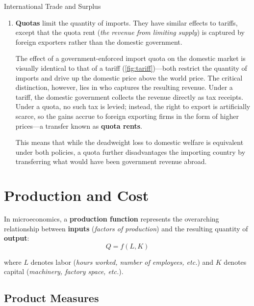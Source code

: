 \documentclass[10pt]{article}
\begin{document}
\begin{core}{International Trade and Surplus}
\begin{enumerate}
        \item \textbf{Quotas} limit the quantity of imports. They have similar effects to tariffs, except that the quota rent (\textit{the revenue from limiting supply}) is captured by foreign exporters rather than the domestic government.

        The effect of a government-enforced import quota on the domestic market is visually identical to that of a tariff (\autoref{fig:tariff})---both restrict the quantity of imports and drive up the domestic price above the world price. The critical distinction, however, lies in who captures the resulting revenue. Under a tariff, the domestic government collects the revenue directly as tax receipts. Under a quota, no such tax is levied; instead, the right to export is artificially scarce, so the gains accrue to foreign exporting firms in the form of higher prices---a transfer known as \textbf{quota rents}.

        This means that while the deadweight loss to domestic welfare is equivalent under both policies, a quota further disadvantages the importing country by transferring what would have been government revenue abroad.

      \end{enumerate}

    \end{core}
 
\section{Production and Cost}

  In microeconomics, a \textbf{production function} represents the overarching relationship between \textbf{inputs} (\textit{factors of production}) and the resulting quantity of \textbf{output}:
  \[
    Q = f(L,K)
  \]

  where $L$ denotes labor (\textit{hours worked, number of employees, etc.}) and $K$ denotes capital (\textit{machinery, factory space, etc.}).
 
  \subsection{Product Measures}
\end{document}
